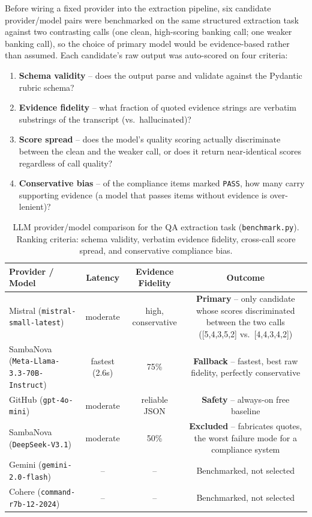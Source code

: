 Before wiring a fixed provider into the extraction pipeline, six
candidate provider/model pairs were benchmarked on the same structured
extraction task against two contrasting calls (one clean, high-scoring
banking call; one weaker banking call), so the choice of primary model
would be evidence-based rather than assumed. Each candidate's raw output
was auto-scored on four criteria:
\begin{enumerate}
  \item \textbf{Schema validity} -- does the output parse and validate
        against the Pydantic rubric schema?
  \item \textbf{Evidence fidelity} -- what fraction of quoted evidence
        strings are verbatim substrings of the transcript (vs.\
        hallucinated)?
  \item \textbf{Score spread} -- does the model's quality scoring
        actually discriminate between the clean and the weaker call, or
        does it return near-identical scores regardless of call quality?
  \item \textbf{Conservative bias} -- of the compliance items marked
        \texttt{PASS}, how many carry supporting evidence (a model that
        passes items without evidence is over-lenient)?
\end{enumerate}

\begin{table}[h]
\centering
\begin{tabular}{lccc}
\hline
\textbf{Provider / Model} & \textbf{Latency} & \textbf{Evidence Fidelity} & \textbf{Outcome} \\
\hline
Mistral (\texttt{mistral-small-latest})            & moderate & high, conservative & \textbf{Primary} -- only candidate whose scores discriminated between the two calls ([5,4,3,5,2] vs.\ [4,4,3,4,2]) \\
SambaNova (\texttt{Meta-Llama-3.3-70B-Instruct})    & fastest (2.6s) & 75\% & \textbf{Fallback} -- fastest, best raw fidelity, perfectly conservative \\
GitHub (\texttt{gpt-4o-mini})                       & moderate & reliable JSON & \textbf{Safety} -- always-on free baseline \\
SambaNova (\texttt{DeepSeek-V3.1})                  & moderate & 50\% & \textbf{Excluded} -- fabricates quotes, the worst failure mode for a compliance system \\
Gemini (\texttt{gemini-2.0-flash})                  & -- & -- & Benchmarked, not selected \\
Cohere (\texttt{command-r7b-12-2024})               & -- & -- & Benchmarked, not selected \\
\hline
\end{tabular}
\caption{LLM provider/model comparison for the QA extraction task
(\texttt{benchmark.py}). Ranking criteria: schema validity, verbatim
evidence fidelity, cross-call score spread, and conservative compliance
bias.}
\end{table}

